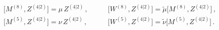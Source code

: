 \begin{equation}
\label{Z42}
\begin{aligned}
{}\big[M^{(8)}, Z^{(4|2)}\big] = \mu\, Z^{(4|2)}\,, \quad \quad &  \big[W^{(8)}, Z^{(4|2)}\big] = \tilde{\mu} \big[M^{(8)}, Z^{(4|2)}\big]\,, \\
{}\big[M^{(5)}, Z^{(4|2)}\big] = \nu\, Z^{(4|2)}\,, \quad \quad &  \big[W^{(5)}, Z^{(4|2)}\big] = \tilde{\nu} \big[M^{(5)}, Z^{(4|2)}\big]\,.
\end{aligned}
\end{equation}

